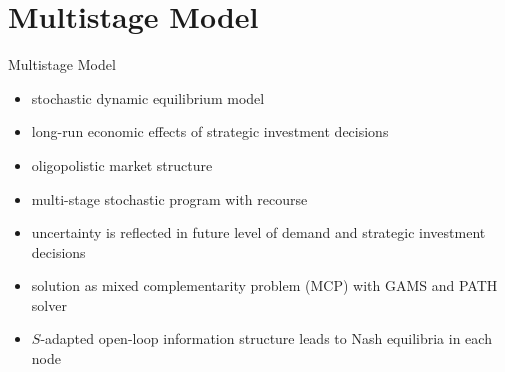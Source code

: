 \section{Multistage Model}

\begin{frame}{Multistage Model}
  \begin{itemize}
  \item stochastic dynamic equilibrium model
  \item long-run economic effects of strategic investment decisions
  \item oligopolistic market structure
  \end{itemize}
  \begin{itemize}
  \item multi-stage stochastic program with recourse
  \item uncertainty is reflected in future level of demand and strategic investment decisions 
  \item solution as mixed complementarity problem (MCP) with GAMS and PATH solver
   \item $S$-adapted open-loop information structure leads to Nash equilibria in each node 
  \end{itemize}
\end{frame}




